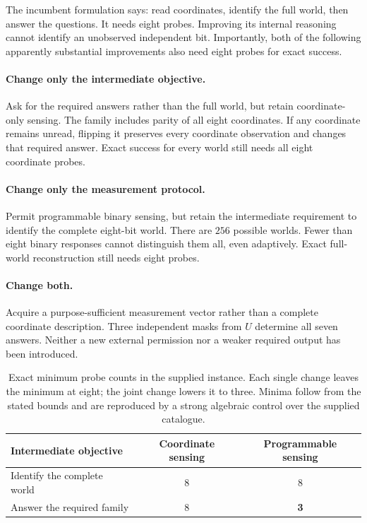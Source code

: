 \documentclass[11pt,letterpaper]{article}
\theoremstyle{remark}\newtheorem{remark}{Remark}[section]
\begin{document}
The incumbent formulation says: read coordinates, identify the full world, then answer the questions. It needs eight probes. Improving its internal reasoning cannot identify an unobserved independent bit. Importantly, both of the following apparently substantial improvements also need eight probes for exact success.

\paragraph{Change only the intermediate objective.}
Ask for the required answers rather than the full world, but retain coordinate-only sensing. The family includes parity of all eight coordinates. If any coordinate remains unread, flipping it preserves every coordinate observation and changes that required answer. Exact success for every world still needs all eight coordinate probes.

\paragraph{Change only the measurement protocol.}
Permit programmable binary sensing, but retain the intermediate requirement to identify the complete eight-bit world. There are $256$ possible worlds. Fewer than eight binary responses cannot distinguish them all, even adaptively. Exact full-world reconstruction still needs eight probes.

\paragraph{Change both.}
Acquire a purpose-sufficient measurement vector rather than a complete coordinate description. Three independent masks from $U$ determine all seven answers. Neither a new external permission nor a weaker required output has been introduced.

\begin{table}[htbp]
\centering
\caption{Exact minimum probe counts in the supplied instance. Each single change leaves the minimum at eight; the joint change lowers it to three. Minima follow from the stated bounds and are reproduced by a strong algebraic control over the supplied catalogue.}
\begin{tabular}{@{}lcc@{}}
\toprule
Intermediate objective & Coordinate sensing & Programmable sensing\\
\midrule
Identify the complete world & 8 & 8\\
Answer the required family & 8 & \textbf{3}\\
\bottomrule
\end{tabular}
\label{tab:factorial}
\end{table}
\end{document}
